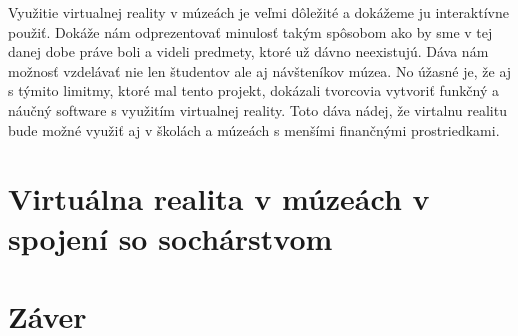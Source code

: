 \documentclass[10pt,twoside,slovak,a4paper]{article}
\begin{document}
Využitie virtualnej reality v múzeách je veľmi dôležité a dokážeme ju interaktívne použiť. Dokáže nám odprezentovať minulosť takým spôsobom ako by sme v tej danej dobe práve boli a videli predmety, ktoré už dávno neexistujú.  Dáva nám možnosť vzdelávať nie len študentov ale aj návšteníkov múzea. No úžasné je, že aj s týmito limitmy, ktoré mal tento projekt, dokázali tvorcovia vytvoriť funkčný a náučný software s využitím virtualnej reality. Toto dáva nádej, že virtalnu realitu bude možné využiť aj v školách a múzeách s menšími finančnými prostriedkami.

\section{Virtuálna realita v múzeách v spojení so sochárstvom} \label{produkt}


\section{Záver} \label{zaver} %






\end{document}
